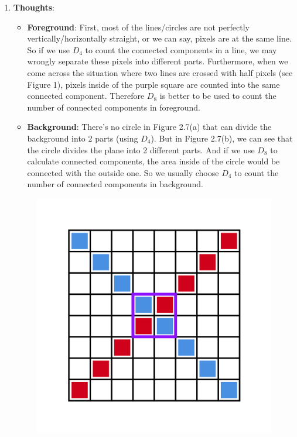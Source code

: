 \documentclass{article}
\begin{document}
\begin{enumerate}[label=A\arabic*)]
\begin{enumerate}[label=(\alph*)]
\begin{tabular}{ | r | c | c |}
					\hline
				\end{tabular}
			\item \textbf{Thoughts}:
				\begin{itemize}
					\item \textbf{Foreground}: First, most of the lines/circles are not perfectly vertically/horizontally straight, or we can say, pixels are at the same line. So if we use $D_{4}$ to count the connected components in a line, we may wrongly separate these pixels into different parts. Furthermore, when we come across the situation where two lines are crossed with half pixels (see Figure 1), pixels inside of the purple square are counted into the same connected component. Therefore $D_{8}$ is better to be used to count the number of connected components in foreground.
					\item \textbf{Background}: There's no circle in Figure 2.7(a) that can divide the background into 2 parts (using $D_{4}$). But in Figure 2.7(b), we can see that the circle divides the plane into 2 different parts. And if we use $D_{8}$ to calculate connected components, the area inside of the circle would be connected with the outside one. So we usually choose $D_{4}$ to count the number of connected components in background.
				\end{itemize}
				\begin{figure}[h!]
		            \centering
		            \includegraphics[width=\linewidth/3]{img-4.jpg}

\end{figure}
\end{enumerate}
\end{enumerate}
\end{document}
